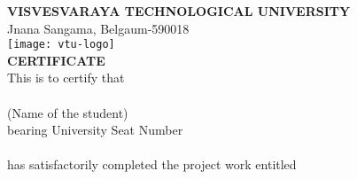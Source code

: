 \documentclass[12pt, a4paper]{report}
\begin{document}
	
	\begin{titlepage}
		\begin{center}
			\textbf{{\large VISVESVARAYA TECHNOLOGICAL UNIVERSITY}}\\
			{\normalsize Jnana Sangama, Belgaum-590018}\\
			\vspace{0.5in}
			\texttt{[image: vtu-logo]}\\
			\vspace{0.5in}
			\textbf{CERTIFICATE}\\
			\vspace{0.3in}
			This is to certify that \\
			\vspace{0.2in}
			\underline{\hspace{10cm}}\\
			\vspace{0.2in}
			(Name of the student)\\
			\vspace{0.2in}
			bearing University Seat Number \\
			\vspace{0.2in}
			\underline{\hspace{10cm}}\\
			\vspace{0.2in}
			has satisfactorily completed the project work entitled \\
			

\end{center}
\end{titlepage}
\end{document}
